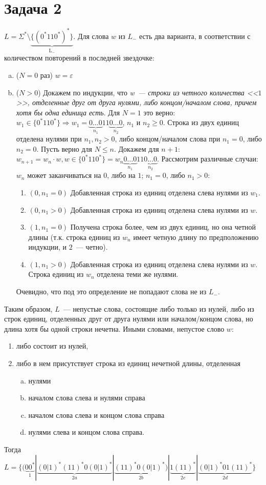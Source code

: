\documentclass[a4paper]{article}
\begin{document}
\section*{Задача 2}
$L=\Sigma^*\setminus{\underbrace{{\{ (0^*110^*)^* \}}}_\mathrm{{L}_{-}}}$. Для слова $w$ из ${L}_{-}$ есть два варианта, в соответствии с количеством повторений в последней звездочке:
\begin{enumerate}[a.]
\item ($N=0$ раз) $w=\varepsilon$
\item ($N>0$) Докажем по индукции, что \emph{w~--- строки из четного количества <<$1$>>, отделенные друг от друга нулями, либо концом/началом слова, причем хотя бы одна единица есть}.\newline
Для $N=1$ это верно: $w_1\in \{0^*110^*\}\Rightarrow w_1=\underbrace{0\dots 0}_{n_1}11\underbrace{0\dots 0}_{n_2}$, $n_1$ и $n_2 \geqslant 0$. Строка из двух единиц отделена нулями при $n_1,n_2>0$, либо концом/началом слова при $n_1=0$, либо $n_2=0$.\newline
Пусть верно для $N\leqslant n$. Докажем для $n+1$: $w_{n+1}=w_n\cdot w, w\in \{0^*110^*\}=w_n\underbrace{0\dots 0}_{n_1}11\underbrace{0\dots 0}_{n_2}$. Рассмотрим различные случаи: $w_n$ может заканчиваться на $0$, либо на $1$; $n_1=0$, либо $n_1>0$:
\begin{enumerate}[1.]
\item $(0,n_1=0)$ Добавленная строка из единиц отделена слева нулями из $w_1$.
\item $(0,n_1>0)$ Добавленная строка из единиц отделена слева нулями из $w$.
\item $(1,n_1=0)$ Получена строка более, чем из двух единиц, но она четной длины (т.к. строка единиц из $w_n$ имеет четную длину по предположению индукции, и $2$~--- четно).
\item $(1,n_1>0)$ Добавленная строка из единиц отделена слева нулями из $w$. Строка единиц из $w_n$ отделена теми же нулями.
\end{enumerate}
Очевидно, что под это определение не попадают слова не из $L_-$.
\end{enumerate}
Таким образом, $L$~--- непустые слова, состоящие либо только из нулей, либо из строк единиц, отделенных друг от друга нулями или началом/концом слова, но длина хотя бы одной строки нечетна. Иными словами, непустое слово $w$:
\begin{enumerate}[1.]
\item либо состоит из нулей,
\item либо в нем присутствует строка из единиц нечетной длины, отделенная
\begin{enumerate}[a.]
 \item нулями
 \item началом слова слева и нулями справа
 \item началом слова слева и концом слова справа
 \item нулями слева и концом слова справа.
\end{enumerate}
\end{enumerate}
Тогда $L=\{(\underbrace{00^*}_{1}|\underbrace{{(0|1)}^*{(11)}^*0{(0|1)}^*}_{2a}|\underbrace{{(11)}^*0{(0|1)}^*)}_{2b}|\underbrace{1{(11)}^*}_{2c}|\underbrace{{(0|1)}^*01{(11)}^*}_{2d}\}$
\end{document}
